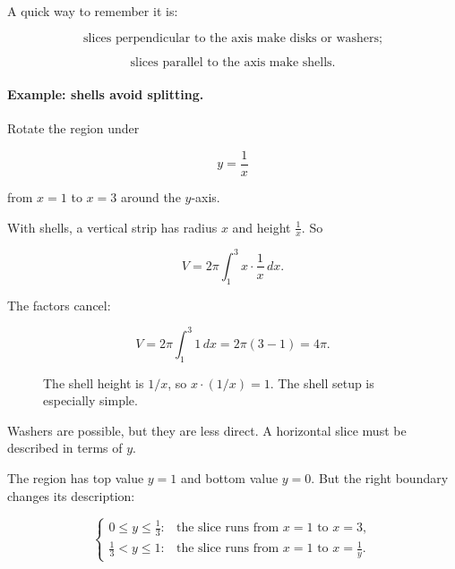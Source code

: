 A quick way to remember it is:

\[
\boxed{
\text{slices perpendicular to the axis make disks or washers;}
}
\]

\[
\boxed{
\text{slices parallel to the axis make shells.}
}
\]

\paragraph{Example: shells avoid splitting.}
Rotate the region under

\[
y=\frac1x
\]

from \(x=1\) to \(x=3\) around the \(y\)-axis.

With shells, a vertical strip has radius \(x\) and height \(\frac1x\).  So

\[
V=2\pi\int_1^3 x\cdot\frac1x\,dx.
\]

The factors cancel:

\[
V=2\pi\int_1^3 1\,dx
=
2\pi(3-1)
=
\boxed{4\pi}.
\]

\begin{figure}[h]
\centering
{}
\caption{The shell height is \(1/x\), so \(x\cdot(1/x)=1\).  The shell setup is especially simple.}
\label{fig:shell-1-over-x}
\end{figure}

Washers are possible, but they are less direct.  A horizontal slice must be described
in terms of \(y\).

The region has top value \(y=1\) and bottom value \(y=0\).  But the right boundary
changes its description:

\[
\begin{cases}
0\le y\le \frac13: & \text{the slice runs from }x=1\text{ to }x=3,\\[2mm]
\frac13<y\le 1: & \text{the slice runs from }x=1\text{ to }x=\frac1y.
\end{cases}
\]

